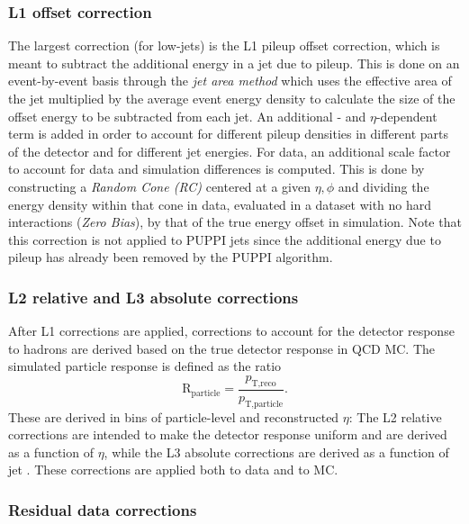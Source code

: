 \subsubsection{L1 offset correction}
The largest correction (for low-\PT jets) is the L1 pileup offset correction, which is meant to subtract the additional energy in a jet due to pileup. This is done on an event-by-event basis through the \textit{jet area method} which uses the effective area of the jet multiplied by the average event energy density to calculate the size of the offset energy to be subtracted from each jet. An additional \PT- and $\eta$-dependent term is added in order to account for different pileup densities in different parts of the detector and for different jet energies. For data, an additional scale factor to account for data and simulation differences is computed. This is done by constructing a \textit{Random Cone (RC)} centered at a given $\eta,\phi$ and dividing the energy density within that cone in data, evaluated in a dataset with no hard interactions (\textit{Zero Bias}), by that of the true energy offset in simulation. Note that this correction is not applied to PUPPI jets since the additional energy due to pileup has already been removed by the PUPPI algorithm.

\subsubsection{L2 relative and L3 absolute corrections}
After L1 corrections are applied, corrections to account for the detector response to hadrons are derived based on the true detector response in QCD MC. The simulated particle response is defined as the ratio
\begin{equation}
  \textrm{R}_{\textrm{particle}}=\frac{p_{\textrm{T,reco}}}{p_{\textrm{T,particle}}}.
  \end{equation}
 These are derived in bins of particle-level \PT and reconstructed $\eta$: The L2 relative corrections are intended to make the detector response uniform and are derived as a function of $\eta$, while the L3 absolute corrections are derived as a function of jet \PT. These corrections are applied both to data and to MC.
 
\subsubsection{Residual data corrections}

